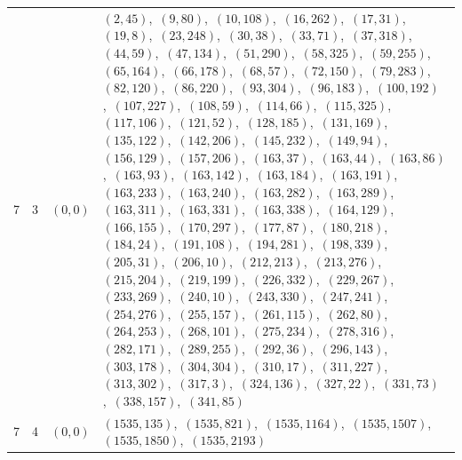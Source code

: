 \documentclass[11pt]{article}
\begin{document}
\begin{longtable}{@{}rrl>{\raggedright\arraybackslash}p{}@{}}
7 & 3 & $(0,0)$ & $(2,45)$,\allowbreak\ $(9,80)$,\allowbreak\ $(10,108)$,\allowbreak\ $(16,262)$,\allowbreak\ $(17,31)$,\allowbreak\ $(19,8)$,\allowbreak\ $(23,248)$,\allowbreak\ $(30,38)$,\allowbreak\ $(33,71)$,\allowbreak\ $(37,318)$,\allowbreak\ $(44,59)$,\allowbreak\ $(47,134)$,\allowbreak\ $(51,290)$,\allowbreak\ $(58,325)$,\allowbreak\ $(59,255)$,\allowbreak\ $(65,164)$,\allowbreak\ $(66,178)$,\allowbreak\ $(68,57)$,\allowbreak\ $(72,150)$,\allowbreak\ $(79,283)$,\allowbreak\ $(82,120)$,\allowbreak\ $(86,220)$,\allowbreak\ $(93,304)$,\allowbreak\ $(96,183)$,\allowbreak\ $(100,192)$,\allowbreak\ $(107,227)$,\allowbreak\ $(108,59)$,\allowbreak\ $(114,66)$,\allowbreak\ $(115,325)$,\allowbreak\ $(117,106)$,\allowbreak\ $(121,52)$,\allowbreak\ $(128,185)$,\allowbreak\ $(131,169)$,\allowbreak\ $(135,122)$,\allowbreak\ $(142,206)$,\allowbreak\ $(145,232)$,\allowbreak\ $(149,94)$,\allowbreak\ $(156,129)$,\allowbreak\ $(157,206)$,\allowbreak\ $(163,37)$,\allowbreak\ $(163,44)$,\allowbreak\ $(163,86)$,\allowbreak\ $(163,93)$,\allowbreak\ $(163,142)$,\allowbreak\ $(163,184)$,\allowbreak\ $(163,191)$,\allowbreak\ $(163,233)$,\allowbreak\ $(163,240)$,\allowbreak\ $(163,282)$,\allowbreak\ $(163,289)$,\allowbreak\ $(163,311)$,\allowbreak\ $(163,331)$,\allowbreak\ $(163,338)$,\allowbreak\ $(164,129)$,\allowbreak\ $(166,155)$,\allowbreak\ $(170,297)$,\allowbreak\ $(177,87)$,\allowbreak\ $(180,218)$,\allowbreak\ $(184,24)$,\allowbreak\ $(191,108)$,\allowbreak\ $(194,281)$,\allowbreak\ $(198,339)$,\allowbreak\ $(205,31)$,\allowbreak\ $(206,10)$,\allowbreak\ $(212,213)$,\allowbreak\ $(213,276)$,\allowbreak\ $(215,204)$,\allowbreak\ $(219,199)$,\allowbreak\ $(226,332)$,\allowbreak\ $(229,267)$,\allowbreak\ $(233,269)$,\allowbreak\ $(240,10)$,\allowbreak\ $(243,330)$,\allowbreak\ $(247,241)$,\allowbreak\ $(254,276)$,\allowbreak\ $(255,157)$,\allowbreak\ $(261,115)$,\allowbreak\ $(262,80)$,\allowbreak\ $(264,253)$,\allowbreak\ $(268,101)$,\allowbreak\ $(275,234)$,\allowbreak\ $(278,316)$,\allowbreak\ $(282,171)$,\allowbreak\ $(289,255)$,\allowbreak\ $(292,36)$,\allowbreak\ $(296,143)$,\allowbreak\ $(303,178)$,\allowbreak\ $(304,304)$,\allowbreak\ $(310,17)$,\allowbreak\ $(311,227)$,\allowbreak\ $(313,302)$,\allowbreak\ $(317,3)$,\allowbreak\ $(324,136)$,\allowbreak\ $(327,22)$,\allowbreak\ $(331,73)$,\allowbreak\ $(338,157)$,\allowbreak\ $(341,85)$\\
7 & 4 & $(0,0)$ & $(1535,135)$,\allowbreak\ $(1535,821)$,\allowbreak\ $(1535,1164)$,\allowbreak\ $(1535,1507)$,\allowbreak\ $(1535,1850)$,\allowbreak\ $(1535,2193)$\\

\end{longtable}
\end{document}
